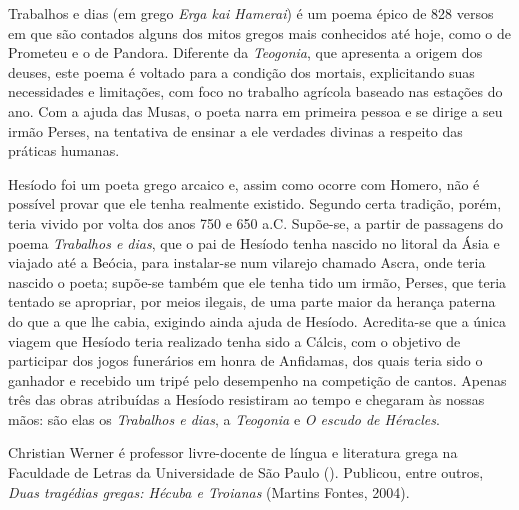 \begin{resumopage}


\item[Trabalhos e dias] (em grego \textit{Erga kai Hamerai}) é um poema épico de 828 versos em que são contados alguns dos mitos gregos mais conhecidos até hoje, como o de Prometeu e o de Pandora. Diferente da \textit{Teogonia}, que apresenta a origem dos deuses, este poema é voltado para a condição dos mortais, explicitando suas necessidades e limitações, com foco no trabalho agrícola baseado nas estações do ano. Com a ajuda das Musas, o poeta narra em primeira pessoa e se dirige a seu irmão Perses, na tentativa de ensinar a ele verdades divinas a respeito das práticas humanas.

\item[Hesíodo] foi um poeta grego arcaico e, assim como ocorre com Homero, não é possível provar que ele tenha realmente existido. Segundo certa tradição, porém, teria vivido por volta dos anos 750 e 650 a.C.  Supõe-se, a partir de passagens do poema \textit{Trabalhos e dias}, que o pai de Hesíodo tenha nascido no litoral da Ásia e viajado até a Beócia, para instalar-se num vilarejo chamado Ascra, onde teria nascido o poeta; supõe-se também que ele tenha tido um irmão, Perses, que teria tentado se apropriar, por meios ilegais, de uma parte maior da herança paterna do que a que lhe cabia, exigindo ainda ajuda de Hesíodo. Acredita-se que a única viagem que Hesíodo teria realizado tenha sido a Cálcis, com o objetivo de participar dos jogos funerários em honra de Anfidamas, dos quais teria sido o ganhador e recebido um tripé pelo desempenho na competição de cantos. Apenas três das obras atribuídas a Hesíodo resistiram ao tempo e chegaram às nossas mãos: são elas os \textit{Trabalhos e dias}, a \textit{Teogonia} e \textit{O escudo de Héracles}.


\item[Christian Werner] é professor livre-docente de língua e literatura grega na Faculdade de Letras da Universidade de São Paulo (). Publicou, entre outros, \textit{Duas tragédias gregas: Hécuba e Troianas} (Martins Fontes, 2004).

\end{resumopage}
 
